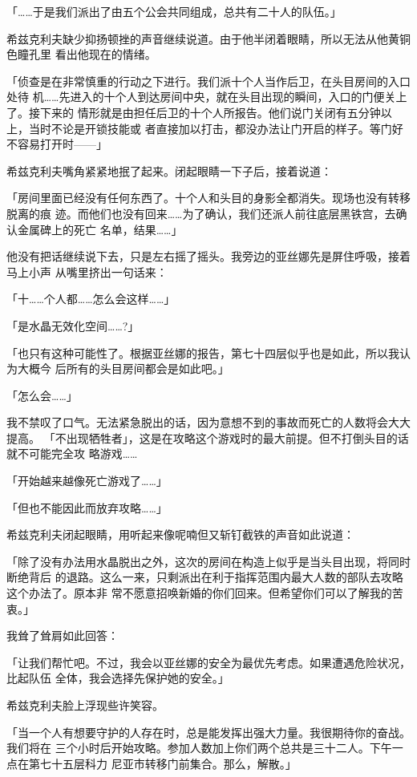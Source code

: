 \documentclass[11pt]{book}
\begin{document}
「……于是我们派出了由五个公会共同组成，总共有二十人的队伍。」

希兹克利夫缺少抑扬顿挫的声音继续说道。由于他半闭着眼睛，所以无法从他黄铜色瞳孔里
看出他现在的情绪。

「侦查是在非常慎重的行动之下进行。我们派十个人当作后卫，在头目房间的入口处待
机……先进入的十个人到达房间中央，就在头目出现的瞬间，入口的门便关上了。接下来的
情形就是由担任后卫的十个人所报告。他们说门关闭有五分钟以上，当时不论是开锁技能或
者直接加以打击，都没办法让门开启的样子。等门好不容易打开时——」

希兹克利夫嘴角紧紧地抿了起来。闭起眼睛一下子后，接着说道：

「房间里面已经没有任何东西了。十个人和头目的身影全都消失。现场也没有转移脱离的痕
迹。而他们也没有回来……为了确认，我们还派人前往底层黑铁宫，去确认金属碑上的死亡
名单，结果……」

他没有把话继续说下去，只是左右摇了摇头。我旁边的亚丝娜先是屏住呼吸，接着马上小声
从嘴里挤出一句话来：

「十……个人都……怎么会这样……」

「是水晶无效化空间……?」

「也只有这种可能性了。根据亚丝娜的报告，第七十四层似乎也是如此，所以我认为大概今
后所有的头目房间都会是如此吧。」

「怎么会……」

我不禁叹了口气。无法紧急脱出的话，因为意想不到的事故而死亡的人数将会大大提高。
「不出现牺牲者」，这是在攻略这个游戏时的最大前提。但不打倒头目的话就不可能完全攻
略游戏……

「开始越来越像死亡游戏了……」

「但也不能因此而放弃攻略……」

希兹克利夫闭起眼睛，用听起来像呢喃但又斩钉截铁的声音如此说道：

「除了没有办法用水晶脱出之外，这次的房间在构造上似乎是当头目出现，将同时断绝背后
的退路。这么一来，只剩派出在利于指挥范围内最大人数的部队去攻略这个办法了。原本非
常不愿意招唤新婚的你们回来。但希望你们可以了解我的苦衷。」

我耸了耸肩如此回答：

「让我们帮忙吧。不过，我会以亚丝娜的安全为最优先考虑。如果遭遇危险状况，比起队伍
全体，我会选择先保护她的安全。」

希兹克利夫脸上浮现些许笑容。

「当一个人有想要守护的人存在时，总是能发挥出强大力量。我很期待你的奋战。我们将在
三个小时后开始攻略。参加人数加上你们两个总共是三十二人。下午一点在第七十五层科力
尼亚市转移门前集合。那么，解散。」
\end{document}
